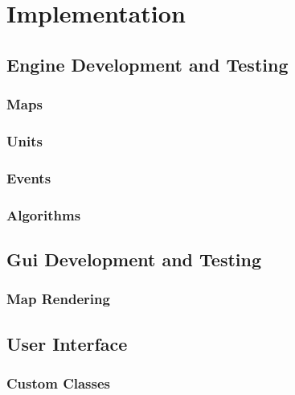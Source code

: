 
\section{Implementation}

\subsection{Engine Development and Testing}
\label{sub:engine_development_and_testing}

\subsubsection{Maps}
\label{ssub:maps}

\subsubsection{Units}
\label{ssub:units}

\subsubsection{Events}
\label{ssub:events}

\subsubsection{Algorithms}
\label{ssub:Algorithms}


\subsection{Gui Development and Testing}

\subsubsection{Map Rendering}
\label{ssub:map_rendering}

\subsection{User Interface}


\subsubsection{Custom Classes} %
\label{ssub:custom_classes}


